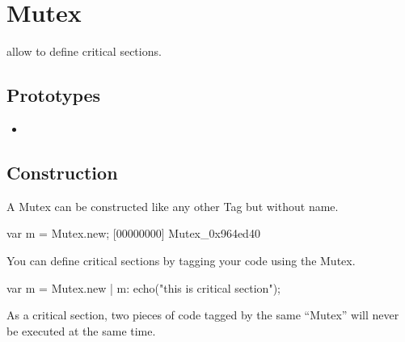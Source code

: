 \section{Mutex}

 allow to define critical sections.

\subsection{Prototypes}
\begin{itemize}
\item {}
\end{itemize}

\subsection{Construction}
A Mutex can be constructed like any other Tag but without name.

\begin{urbiscript}
var m = Mutex.new;
[00000000] Mutex_0x964ed40
\end{urbiscript}

You can define critical sections by tagging your code using the Mutex.

\begin{urbiscript}
var m = Mutex.new |
m: echo("this is critical section");
\end{urbiscript}

As a critical section, two pieces of code tagged by the same ``Mutex'' will never be executed at the same time.

